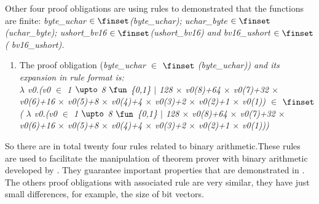 Other four proof obligations are using rules to demonstrated that the functions
are finite: \it byte\_uchar  $ \in \finset$\rm (\it byte\_uchar\rm ); \it
uchar\_byte  $ \in \finset$\rm (\it uchar\_byte\rm ); \it ushort\_bv16 $ \in
\finset$\rm (\it ushort\_bv16\rm ) and \it bv16\_ushort $ \in \finset$\rm (\it
bv16\_ushort\rm ).
\begin{enumerate}
\item  The proof obligation (\it byte\_uchar $\in$   $\finset$ \rm (\it byte\_uchar\rm )) and its expansion in rule format is:\\ 
 $\lambda$ \it v0\rm .\rm (\it v0 $\in$  \rm 1 $\upto$ \rm 8  $\fun$  \rm \{\rm 0\rm ,\rm 1\rm \}  $\mid$  \rm 1\rm 2\rm 8 $\times$ \it v0\rm (\rm 8\rm )\rm +\rm 6\rm 4 $\times$ \it v0\rm (\rm 7\rm )\rm +\rm 3\rm 2 $\times$ \it v0\rm (\rm 6\rm )\rm +\rm 1\rm 6 $\times$ \it v0\rm (\rm 5\rm )\rm +\rm 8 $\times$ \it v0\rm (\rm 4\rm )\rm +\rm 4 $\times$ \it v0\rm (\rm 3\rm )\rm +\rm 2 $\times$ \it v0\rm (\rm 2\rm )\rm +\rm 1 $\times$ \it v0\rm (\rm 1\rm )\rm ) $\in$   $\finset$ \rm ( $\lambda$ \it v0\rm .\rm (\it v0 $\in$  \rm 1 $\upto$ \rm 8  $\fun$  \rm \{\rm 0\rm ,\rm 1\rm \}  $\mid$  \rm 1\rm 2\rm 8 $\times$ \it v0\rm (\rm 8\rm )\rm +\rm 6\rm 4 $\times$ \it v0\rm (\rm 7\rm )\rm +\rm 3\rm 2 $\times$ \it v0\rm (\rm 6\rm )\rm +\rm 1\rm 6 $\times$ \it v0\rm (\rm 5\rm )\rm +\rm 8 $\times$ \it v0\rm (\rm 4\rm )\rm +\rm 4 $\times$ \it v0\rm (\rm 3\rm )\rm +\rm 2 $\times$ \it v0\rm (\rm 2\rm )\rm +\rm 1 $\times$ \it v0\rm (\rm 1\rm )\rm )\rm )  \\


\end{enumerate}


So there are in total twenty four rules related to binary arithmetic.These rules
are used to facilitate the manipulation of theorem prover with binary arithmetic
developed by \cite{Leibnizens}. They guarantee important properties that are
demonstrated in \cite{James2010,Dasgupta2006}. The others proof obligations with
associated rule are very similar, they have just small differences, for example,
the size of bit vectors.











